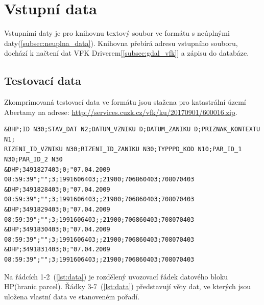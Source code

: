 \section{Vstupní data}
Vstupními daty je pro knihovnu textový soubor ve formátu  s
neúplnými daty(\ref{subsec:neuplna_data}). Knihovna přebírá adresu
vstupního souboru, dochází k načtení dat VFK
Driverem[\ref{subsec:gdal_vfk}] a zápisu do databáze.

\subsection{Testovací data}
Zkomprimovaná testovací data ve formátu  jsou stažena pro
katastrální území Abertamy na adrese:
\href{http://services.cuzk.cz/vfk/ku/20170901/600016.zip}{http://services.cuzk.cz/vfk/ku/20170901/600016.zip}.
     {\scriptsize
\begin{lstlisting}[caption=Ukázka bloku hranic parcel(HP) -- definice bloků a věty dat(zdroj:vlastní), label=lst:data]
&BHP;ID N30;STAV_DAT N2;DATUM_VZNIKU D;DATUM_ZANIKU D;PRIZNAK_KONTEXTU N1;
RIZENI_ID_VZNIKU N30;RIZENI_ID_ZANIKU N30;TYPPPD_KOD N10;PAR_ID_1 N30;PAR_ID_2 N30
&DHP;3491827403;0;"07.04.2009 08:59:39";"";3;1991606403;;21900;706860403;708070403 
&DHP;3491828403;0;"07.04.2009 08:59:39";"";3;1991606403;;21900;706860403;708070403
&DHP;3491829403;0;"07.04.2009 08:59:39";"";3;1991606403;;21900;706860403;708070403
&DHP;3491830403;0;"07.04.2009 08:59:39";"";3;1991606403;;21900;706860403;708070403
&DHP;3491831403;0;"07.04.2009 08:59:39";"";3;1991606403;;21900;706860403;708070403
\end{lstlisting}}
Na řádcích 1-2~(\ref{lst:data}) je rozdělený uvozovací řádek datového
bloku HP(hranic parcel). Řádky 3-7~(\ref{lst:data}) představují věty
dat, ve kterých jsou uložena vlastní data ve stanoveném pořadí.
